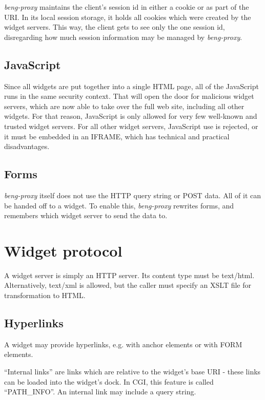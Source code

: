 \documentclass[a4paper,12pt]{article}
\begin{document}
\emph{beng-proxy} maintains the client's session id in either a cookie
or as part of the URI.  In its local session storage, it holds all
cookies which were created by the widget servers.  This way, the
client gets to see only the one session id, disregarding how much
session information may be managed by \emph{beng-proxy}.


\subsection{JavaScript}

Since all widgets are put together into a single HTML page, all of the
JavaScript runs in the same security context.  That will open the door
for malicious widget servers, which are now able to take over the full
web site, including all other widgets.  For that reason, JavaScript is
only allowed for very few well-known and trusted widget servers.  For
all other widget servers, JavaScript use is rejected, or it must be
embedded in an IFRAME, which has technical and practical
disadvantages.


\subsection{Forms}

\emph{beng-proxy} itself does not use the HTTP query string or POST
data.  All of it can be handed off to a widget.  To enable this,
\emph{beng-proxy} rewrites forms, and remembers which widget server to
send the data to.


\section{Widget protocol}

A widget server is simply an HTTP server.  Its content type must be
text/html.  Alternatively, text/xml is allowed, but the caller must
specify an XSLT file for transformation to HTML.


\subsection{Hyperlinks}

A widget may provide hyperlinks, e.g. with anchor elements or with
FORM elements.

``Internal links'' are links which are relative to the widget's base
URI - these links can be loaded into the widget's dock.  In CGI, this
feature is called ``PATH\_INFO''.  An internal link may include a
query string.
\end{document}
